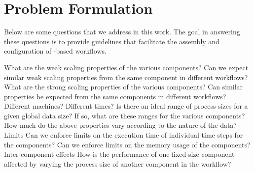 \section{Problem Formulation}
\label{s:problem}
Below are some questions that we address in this work. The goal in answering these questions is to provide 
guidelines that facilitate the assembly and configuration of \sys-based workflows.
\begin{outline}
  \1 What are the weak scaling properties of the various components?
  \1 Can we expect similar weak scaling properties from the same component in different workflows?
  \1 What are the strong scaling properties of the various components?
    \2 Can similar properties be expected from the same components in different workflows? Different machines? Different times?
    \2 Is there an ideal range of process sizes for a given global data size? If so, what are these ranges for the various components?
  \1 How much do the above properties vary according to the nature of the data?
  \1 Limits
    \2 Can we enforce limits on the execution time of individual time steps for the \sys components?
    \2 Can we enforce limits on the memory usage of the components?
  \1 Inter-component effects
    \2 How is the performance of one fixed-size component affected by varying the process size of another component in the workflow?
\end{outline}
